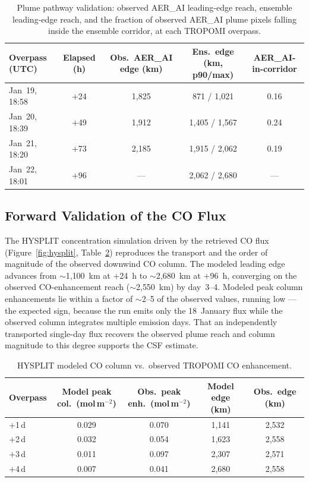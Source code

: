 \documentclass[draft]{agujournal2019}
\begin{document}
\begin{table}[h]
\centering
\caption{Plume pathway validation: observed AER\_AI leading-edge reach, ensemble leading-edge reach, and the fraction of observed AER\_AI plume pixels falling inside the ensemble corridor, at each TROPOMI overpass.}
\label{tab:trajectories}
\begin{tabular}{lcccc}
\toprule
Overpass (UTC) & Elapsed (h) & Obs.\ AER\_AI edge (km) & Ens.\ edge (km, p90/max) & AER\_AI-in-corridor \\
\midrule
Jan~19, 18:58 & $+$24 & 1{,}825 & 871 / 1{,}021 & 0.16 \\
Jan~20, 18:39 & $+$49 & 1{,}912 & 1{,}405 / 1{,}567 & 0.24 \\
Jan~21, 18:20 & $+$73 & 2{,}185 & 1{,}915 / 2{,}062 & 0.19 \\
Jan~22, 18:01 & $+$96 & --- & 2{,}062 / 2{,}680 & --- \\
\bottomrule
\end{tabular}
\end{table}

\subsection{Forward Validation of the CO Flux}
\label{sec:hysplit_results}

The HYSPLIT concentration simulation driven by the retrieved CO flux (Figure~\ref{fig:hysplit}, Table~\ref{tab:hysplit}) reproduces the transport and the order of magnitude of the observed downwind CO column. The modeled leading edge advances from $\sim$1{,}100~km at $+$24~h to $\sim$2{,}680~km at $+$96~h, converging on the observed CO-enhancement reach ($\sim$2{,}550~km) by day~3--4. Modeled peak column enhancements lie within a factor of $\sim$2--5 of the observed values, running low --- the expected sign, because the run emits only the 18~January flux while the observed column integrates multiple emission days. That an independently transported single-day flux recovers the observed plume reach and column magnitude to this degree supports the CSF estimate.

\begin{table}[h]
\centering
\caption{HYSPLIT modeled CO column vs.\ observed TROPOMI CO enhancement.}
\label{tab:hysplit}
\begin{tabular}{lcccc}
\toprule
Overpass & Model peak col.\ (mol\,m$^{-2}$) & Obs.\ peak enh.\ (mol\,m$^{-2}$)
  & Model edge (km) & Obs.\ edge (km) \\
\midrule
$+$1\,d & 0.029 & 0.070 & 1{,}141 & 2{,}532 \\
$+$2\,d & 0.032 & 0.054 & 1{,}623 & 2{,}558 \\
$+$3\,d & 0.011 & 0.097 & 2{,}307 & 2{,}571 \\
$+$4\,d & 0.007 & 0.041 & 2{,}680 & 2{,}558 \\
\bottomrule
\end{tabular}
\end{table}
\end{document}

